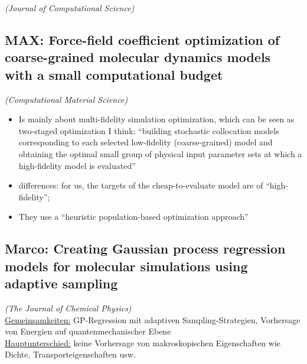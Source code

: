 \documentclass[preprint,12pt]{elsarticle}
\begin{document}
\textit{(Journal of Computational Science)}\cite{kadupitiya2020machine}

\subsection{ MAX: Force-field coefficient optimization of coarse-grained molecular dynamics models with a small computational budget} \textit{(Computational Material Science)}\cite{razi2020force}
\begin{itemize}
    \item Is mainly about multi-fidelity simulation optimization, which can be seen as two-staged optimization I think: ``building stochastic collocation models corresponding to each selected low-fidelity (coarse-grained) model and obtaining the optimal small group of physical input parameter sets at which a high-fidelity model is evaluated''
    \item differences: for us, the targets of the cheap-to-evaluate model are of ``high-fidelity''; \item They use a ``heuristic population-based optimization approach''
\end{itemize}

\subsection{Marco: Creating Gaussian process regression models for molecular simulations using adaptive sampling}
\textit{(The Journal of Chemical Physics)} \cite{burn2020creating}\\
\underline{Gemeinsamkeiten:} GP-Regression mit adaptiven Sampling-Strategien, Vorhersage von Energien auf quantenmechanischer Ebene\\
\underline{Hauptunterschied:} keine Vorhersage von makroskopischen Eigenschaften wie Dichte, Transporteigenschaften usw.
\end{document}
